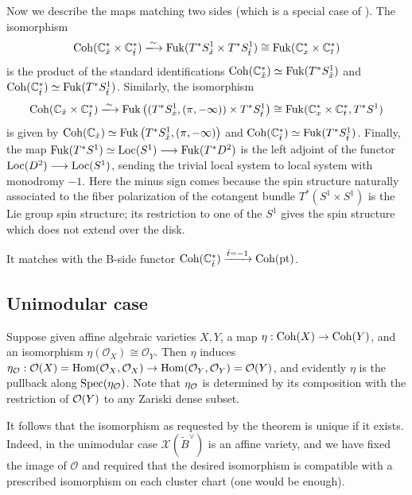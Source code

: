 \documentclass[12pt, letter]{amsart}
\DeclareMathOperator{\Fuk}{Fuk}
\theoremstyle{definition}
\begin{document}
Now we describe the maps matching two sides (which is a special case of \cite{GLe}). The isomorphism
\[
\Coh(\bC_{\c x}^* \times \bC_{\c t}^*)\xlongrightarrow{\sim}\Fuk( T^*S^1_{\c x} \times T^*S^1_{\c t} ) \cong \Fuk(\bC^*_x \times \bC^*_t)
\]
is the product of the standard identifications \( \Coh(\bC^*_{\c x}) \simeq \Fuk(T^*S^1_{\c x})\) and \(\Coh(\bC^*_{\c t} ) \simeq \Fuk(T^*S^1_{\c t}) \).  Similarly, the isomorphism 
\[
    \Coh( \bC_{\c x} \times \bC_{\c t}^*) \xlongrightarrow{\sim} \Fuk\big( (T^*S^1_{\c x}, (\pi, -\infty)) \times T^*S^1_{\c t}  \big) \cong \Fuk(\bC^*_x \times \bC^*_t , T^*S^1)  
\]
is given by \( \Coh ( \bC_{\c x}) \simeq \Fuk\big(T^*S^1_{\c x}, (\pi, -\infty) \big) \) and  \(\Coh(\bC^*_{\c t} ) \simeq \Fuk(T^*S^1_{\c t}) \). Finally, the map \(\Fuk(T^*S^1) \simeq \Loc(S^1) \longrightarrow \Fuk(T^*D^2)\) is the left adjoint of the functor \( \operatorname{Loc}(D^2) \longrightarrow \operatorname{Loc}(S^1)\), sending the trivial local system to local system with monodromy \(-1\). Here the minus sign comes because the spin structure naturally associated to the fiber polarization of the cotangent bundle $T^*(S^1 \times S^1)$ is the Lie group spin structure; its restriction to one of the $S^1$ gives the spin structure which does not extend over the disk. 

It matches with the B-side functor
\( \operatorname{Coh}(\mathbb{C}_{\check t}^* ) \xrightarrow{\check t = -1} \operatorname{Coh}(\mathrm{pt}) \). 




\subsection{Unimodular case}

Suppose given affine algebraic varieties $X, Y$, a map $\eta: \operatorname{Coh}(X) \to \operatorname{Coh}(Y)$, and an isomorphism $\eta (\mathcal{O}_X) \cong \mathcal{O}_Y$.  Then $\eta$ induces 
$\eta_{\mathcal{O}}: \mathcal{O}(X) = \operatorname{Hom}(\mathcal{O}_X, \mathcal{O}_X) \to \operatorname{Hom}(\mathcal{O}_Y, \mathcal{O}_Y) = \mathcal{O}(Y)$, and evidently $\eta$ is the pullback along $\operatorname{Spec}(\eta_{\mathcal{O}})$.  Note that $\eta_{\mathcal{O}}$ is determined by its composition with the restriction of $\mathcal{O}(Y)$ to any Zariski dense subset.  


It follows that the  isomorphism as requested by the theorem is unique if it exists.  Indeed, in the unimodular case $\mathcal{X}(\widetilde B^\vee)$ is an affine variety, and we have fixed the image of $\mathcal{O}$ and required that the desired isomorphism is compatible with a prescribed isomorphism on each cluster chart (one would be enough). 
\end{document}
